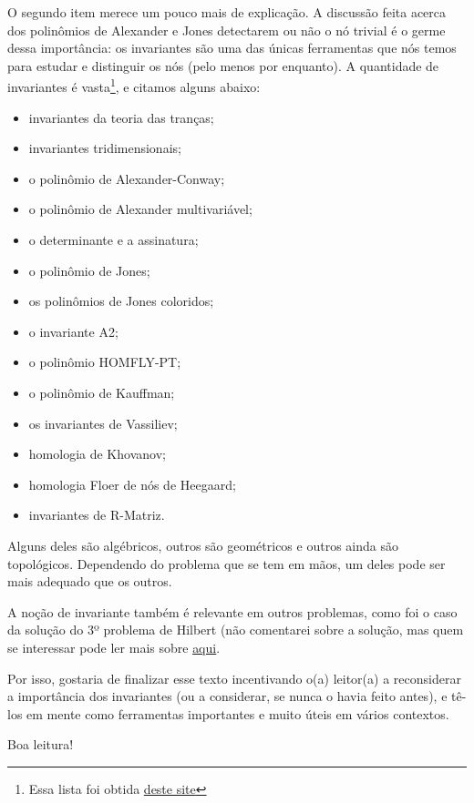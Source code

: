     \par\vspace{0.3cm} O segundo item merece um pouco mais de explicação. A discussão feita acerca
    dos polinômios de Alexander e Jones detectarem ou não o nó trivial é o germe dessa importância:
    os invariantes são uma das únicas ferramentas que nós temos para estudar e distinguir os nós
    (pelo menos por enquanto). A quantidade de invariantes é vasta\footnote{Essa lista foi obtida
    \href{http://katlas.org/wiki/Invariants}{deste site}}, e citamos alguns abaixo:
    \begin{itemize}
        \item invariantes da teoria das tranças;
        \item invariantes tridimensionais;
        \item o polinômio de Alexander-Conway;
        \item o polinômio de Alexander multivariável;
        \item o determinante e a assinatura;
        \item o polinômio de Jones;
        \item os polinômios de Jones coloridos;
        \item o invariante A2;
        \item o polinômio HOMFLY-PT;
        \item o polinômio de Kauffman;
        \item os invariantes de Vassiliev;
        \item homologia de Khovanov;
        \item homologia Floer de nós de Heegaard;
        \item invariantes de R-Matriz.
    \end{itemize}
    \par Alguns deles são algébricos, outros são geométricos e outros ainda são topológicos.
    Dependendo do problema que se tem em mãos, um deles pode ser mais adequado que os outros.
    
    \par\vspace{0.3cm} A noção de invariante também é relevante em outros problemas, como foi o caso
    da solução do 3º problema de Hilbert (não comentarei sobre a solução, mas quem se interessar pode
    ler mais sobre \href{https://en.wikipedia.org/wiki/Hilbert\%27s_third_problem}{aqui}.
    
    \par\vspace{0.3cm} Por isso, gostaria de finalizar esse texto incentivando o(a) leitor(a) a 
    reconsiderar a importância dos invariantes (ou a considerar, se nunca o havia feito antes), e
    tê-los em mente como ferramentas importantes e muito úteis em vários contextos.
    
    \par\vspace{0.3cm} Boa leitura!